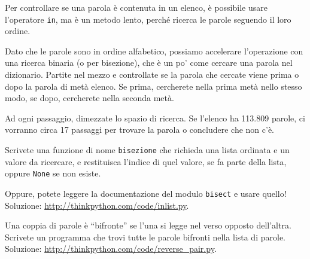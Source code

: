 \documentclass[10pt]{book}
\begin{document}
\vspace{0.2in}
\begin{exercise}
\label{wordlist1}
\label{bisection}

Per controllare se una parola è contenuta in un elenco, è possibile usare l'operatore {\tt in}, ma è un metodo lento, perché ricerca le parole seguendo il loro ordine.

Dato che le parole sono in ordine alfabetico, possiamo accelerare l'operazione con una ricerca binaria (o per bisezione), che è un po' come cercare una parola nel dizionario.
Partite nel mezzo e controllate se la parola che cercate viene prima o dopo la parola di metà elenco. Se prima, cercherete nella prima metà nello stesso modo, se dopo, cercherete nella seconda metà.

Ad ogni passaggio, dimezzate lo spazio di ricerca. Se l'elenco ha 113.809 parole, ci vorranno circa 17 passaggi per trovare la parola o concludere che non c'è.

Scrivete una funzione di nome {\tt bisezione} che richieda una lista ordinata e un valore da ricercare, e restituisca l'indice di quel valore, se fa parte della lista, oppure {\tt None} se non esiste.

Oppure, potete leggere la documentazione del modulo {\tt bisect} e usare quello!  Soluzione: \url{http://thinkpython.com/code/inlist.py}.

\end{exercise}

\vspace{0.2in}
\begin{exercise}

Una coppia di parole è ``bifronte'' se l'una si legge nel verso opposto dell'altra. Scrivete un programma che trovi tutte le parole bifronti nella lista di parole.  Soluzione: \url{http://thinkpython.com/code/reverse_pair.py}.

\end{exercise}
\end{document}
